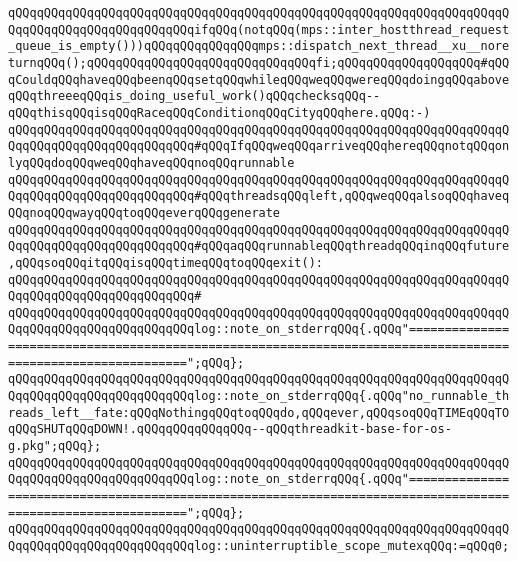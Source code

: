 \newline
\verb|qQQqqQQqqQQqqQQqqQQqqQQqqQQqqQQqqQQqqQQqqQQqqQQqqQQqqQQqqQQqqQQqqQQqqQQqqQQqqQQqqQQqqQQqqQQqqQQqifqQQq(notqQQq(mps::inter_hostthread_request_queue_is_empty()))qQQqqQQqqQQqqQQqmps::dispatch_next_thread__xu__noreturnqQQq();qQQqqQQqqQQqqQQqqQQqqQQqqQQqqQQqfi;qQQqqQQqqQQqqQQqqQQq#qQQqCouldqQQqhaveqQQqbeenqQQqsetqQQqwhileqQQqweqQQqwereqQQqdoingqQQqaboveqQQqthreeeqQQqis_doing_useful_work()qQQqchecksqQQq--qQQqthisqQQqisqQQqRaceqQQqConditionqQQqCityqQQqhere.qQQq:-)|\newline
\newline
\verb|qQQqqQQqqQQqqQQqqQQqqQQqqQQqqQQqqQQqqQQqqQQqqQQqqQQqqQQqqQQqqQQqqQQqqQQqqQQqqQQqqQQqqQQqqQQqqQQq#qQQqIfqQQqweqQQqarriveqQQqhereqQQqnotqQQqonlyqQQqdoqQQqweqQQqhaveqQQqnoqQQqrunnable|\newline
\verb|qQQqqQQqqQQqqQQqqQQqqQQqqQQqqQQqqQQqqQQqqQQqqQQqqQQqqQQqqQQqqQQqqQQqqQQqqQQqqQQqqQQqqQQqqQQqqQQq#qQQqthreadsqQQqleft,qQQqweqQQqalsoqQQqhaveqQQqnoqQQqwayqQQqtoqQQqeverqQQqgenerate|\newline
\verb|qQQqqQQqqQQqqQQqqQQqqQQqqQQqqQQqqQQqqQQqqQQqqQQqqQQqqQQqqQQqqQQqqQQqqQQqqQQqqQQqqQQqqQQqqQQqqQQq#qQQqaqQQqrunnableqQQqthreadqQQqinqQQqfuture,qQQqsoqQQqitqQQqisqQQqtimeqQQqtoqQQqexit():|\newline
\verb|qQQqqQQqqQQqqQQqqQQqqQQqqQQqqQQqqQQqqQQqqQQqqQQqqQQqqQQqqQQqqQQqqQQqqQQqqQQqqQQqqQQqqQQqqQQqqQQq#|\newline
\verb|qQQqqQQqqQQqqQQqqQQqqQQqqQQqqQQqqQQqqQQqqQQqqQQqqQQqqQQqqQQqqQQqqQQqqQQqqQQqqQQqqQQqqQQqqQQqqQQqlog::note_on_stderrqQQq{.qQQq"=============================================================================================================";qQQq};|\newline
\verb|qQQqqQQqqQQqqQQqqQQqqQQqqQQqqQQqqQQqqQQqqQQqqQQqqQQqqQQqqQQqqQQqqQQqqQQqqQQqqQQqqQQqqQQqqQQqqQQqlog::note_on_stderrqQQq{.qQQq"no_runnable_threads_left__fate:qQQqNothingqQQqtoqQQqdo,qQQqever,qQQqsoqQQqTIMEqQQqTOqQQqSHUTqQQqDOWN!.qQQqqQQqqQQqqQQq--qQQqthreadkit-base-for-os-g.pkg";qQQq};|\newline
\verb|qQQqqQQqqQQqqQQqqQQqqQQqqQQqqQQqqQQqqQQqqQQqqQQqqQQqqQQqqQQqqQQqqQQqqQQqqQQqqQQqqQQqqQQqqQQqqQQqlog::note_on_stderrqQQq{.qQQq"=============================================================================================================";qQQq};|\newline
\newline
\verb|qQQqqQQqqQQqqQQqqQQqqQQqqQQqqQQqqQQqqQQqqQQqqQQqqQQqqQQqqQQqqQQqqQQqqQQqqQQqqQQqqQQqqQQqqQQqqQQqlog::uninterruptible_scope_mutexqQQq:=qQQq0;|\newline
